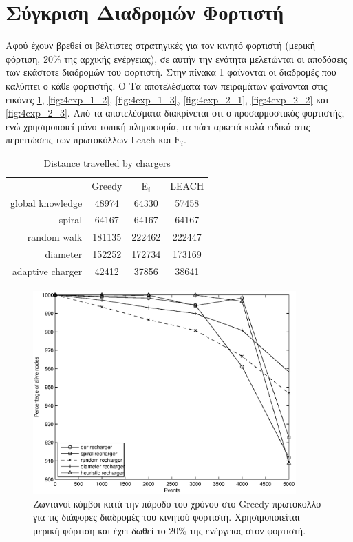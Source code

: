 \section{Σύγκριση Διαδρομών Φορτιστή}
Αφού έχουν βρεθεί οι βέλτιστες στρατηγικές για τον κινητό φορτιστή (μερική φόρτιση, 20\% της αρχικής ενέργειας), σε αυτήν την ενότητα μελετώνται οι αποδόσεις των
εκάστοτε διαδρομών του φορτιστή. Στην πίνακα \ref{tab:dist} φαίνονται οι διαδρομές που καλύπτει ο κάθε φορτιστής. Ο 
Τα αποτελέσματα των πειραμάτων φαίνονται στις εικόνες \ref{fig:4exp_1_1}, \ref{fig:4exp_1_2}, \ref{fig:4exp_1_3}, \ref{fig:4exp_2_1}, \ref{fig:4exp_2_2} και
\ref{fig:4exp_2_3}. Από τα αποτελέσματα διακρίνεται οτι ο προσαρμοστικός φορτιστής, ενώ χρησιμοποιεί μόνο τοπική πληροφορία, τα πάει αρκετά καλά ειδικά στις
περιπτώσεις των πρωτοκόλλων Leach και $\text{E}_{i}$.

\begin{table}[H]
\begin{tabular}{r|c|c|c|}
& Greedy & E$_i$ & LEACH\\\cline{2-4}\cline{2-4}
global knowledge & 48974 & 64330 & 57458\\\cline{2-4}
spiral & 64167 & 64167 & 64167\\\cline{2-4}
random walk & 181135 & 222462 & 222447 \\\cline{2-4}
diameter & 152252 & 172734 & 173169\\\cline{2-4}
adaptive charger & 42412 & 37856 & 38641\\\cline{2-4}
\end{tabular}
\caption{Distance travelled by chargers}
\label{tab:dist}
\end{table}

\begin{figure}[H]
  \centering
  \includegraphics[width=0.9\textwidth]{experiments/classic/4.ourVSnaive/alive_nodes_greedy_rc_per_our-spiral-random-diameter-heuristic.eps}
  \caption{Ζωντανοί κόμβοι κατά την πάροδο του χρόνου στο Greedy πρωτόκολλο για τις διάφορες διαδρομές του κινητού φορτιστή. Χρησιμοποιείται μερική φόρτιση και έχει
δωθεί το 20\% της ενέργειας στον φορτιστή.}
  \label{fig:4exp_1_1}
\end{figure}

